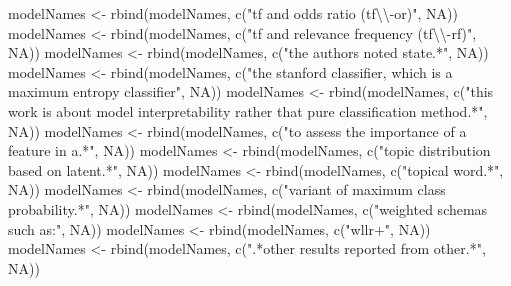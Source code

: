 \documentclass[
]{article}
\newenvironment{Shaded}{\begin{snugshade}}{\end{snugshade}}
\newcommand{\ConstantTok}[1]{\textcolor[rgb]{0.00,0.00,0.00}{#1}}
\newcommand{\FunctionTok}[1]{\textcolor[rgb]{0.00,0.00,0.00}{#1}}
\newcommand{\NormalTok}[1]{#1}
\newcommand{\OtherTok}[1]{\textcolor[rgb]{0.56,0.35,0.01}{#1}}
\newcommand{\SpecialCharTok}[1]{\textcolor[rgb]{0.00,0.00,0.00}{#1}}
\newcommand{\StringTok}[1]{\textcolor[rgb]{0.31,0.60,0.02}{#1}}
\begin{document}
\begin{Shaded}
\begin{Highlighting}[]
\NormalTok{modelNames }\OtherTok{\textless{}{-}} \FunctionTok{rbind}\NormalTok{(modelNames, }\FunctionTok{c}\NormalTok{(}\StringTok{"tf and odds ratio (tf}\SpecialCharTok{\textbackslash{}\textbackslash{}}\StringTok{{-}or)"}\NormalTok{, }\ConstantTok{NA}\NormalTok{))}
\NormalTok{modelNames }\OtherTok{\textless{}{-}} \FunctionTok{rbind}\NormalTok{(modelNames, }\FunctionTok{c}\NormalTok{(}\StringTok{"tf and relevance frequency (tf}\SpecialCharTok{\textbackslash{}\textbackslash{}}\StringTok{{-}rf)"}\NormalTok{, }\ConstantTok{NA}\NormalTok{))}
\NormalTok{modelNames }\OtherTok{\textless{}{-}} \FunctionTok{rbind}\NormalTok{(modelNames, }\FunctionTok{c}\NormalTok{(}\StringTok{"the authors noted state.*"}\NormalTok{, }\ConstantTok{NA}\NormalTok{))}
\NormalTok{modelNames }\OtherTok{\textless{}{-}} \FunctionTok{rbind}\NormalTok{(modelNames, }\FunctionTok{c}\NormalTok{(}\StringTok{"the stanford classifier, which is a maximum entropy classifier"}\NormalTok{, }\ConstantTok{NA}\NormalTok{))}
\NormalTok{modelNames }\OtherTok{\textless{}{-}} \FunctionTok{rbind}\NormalTok{(modelNames, }\FunctionTok{c}\NormalTok{(}\StringTok{"this work is about model interpretability rather that pure classification method.*"}\NormalTok{, }\ConstantTok{NA}\NormalTok{))}
\NormalTok{modelNames }\OtherTok{\textless{}{-}} \FunctionTok{rbind}\NormalTok{(modelNames, }\FunctionTok{c}\NormalTok{(}\StringTok{"to assess the importance of a feature in a.*"}\NormalTok{, }\ConstantTok{NA}\NormalTok{))}
\NormalTok{modelNames }\OtherTok{\textless{}{-}} \FunctionTok{rbind}\NormalTok{(modelNames, }\FunctionTok{c}\NormalTok{(}\StringTok{"topic distribution based on latent.*"}\NormalTok{, }\ConstantTok{NA}\NormalTok{))}
\NormalTok{modelNames }\OtherTok{\textless{}{-}} \FunctionTok{rbind}\NormalTok{(modelNames, }\FunctionTok{c}\NormalTok{(}\StringTok{"topical word.*"}\NormalTok{, }\ConstantTok{NA}\NormalTok{))}
\NormalTok{modelNames }\OtherTok{\textless{}{-}} \FunctionTok{rbind}\NormalTok{(modelNames, }\FunctionTok{c}\NormalTok{(}\StringTok{"variant of maximum class probability.*"}\NormalTok{, }\ConstantTok{NA}\NormalTok{))}
\NormalTok{modelNames }\OtherTok{\textless{}{-}} \FunctionTok{rbind}\NormalTok{(modelNames, }\FunctionTok{c}\NormalTok{(}\StringTok{"weighted schemas such as:"}\NormalTok{, }\ConstantTok{NA}\NormalTok{))}
\NormalTok{modelNames }\OtherTok{\textless{}{-}} \FunctionTok{rbind}\NormalTok{(modelNames, }\FunctionTok{c}\NormalTok{(}\StringTok{"wllr+"}\NormalTok{, }\ConstantTok{NA}\NormalTok{))}
\NormalTok{modelNames }\OtherTok{\textless{}{-}} \FunctionTok{rbind}\NormalTok{(modelNames, }\FunctionTok{c}\NormalTok{(}\StringTok{".*other results reported from other.*"}\NormalTok{, }\ConstantTok{NA}\NormalTok{))}

\end{Highlighting}
\end{Shaded}
\end{document}
